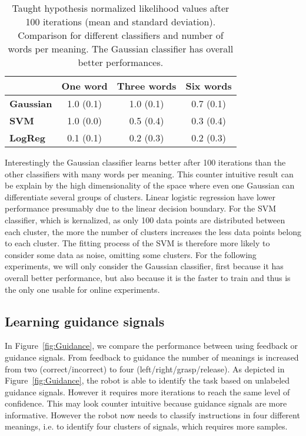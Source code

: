 \begin{table}[!htbp]
\centering
\begin{tabular}{|l|c|c|c|}
\hline
&\textbf{One word}&\textbf{Three words}&\textbf{Six words}\\\hline
\textbf{Gaussian}&1.0 (0.1)&1.0 (0.1)&0.7 (0.1)\\\hline
\textbf{SVM}&1.0 (0.0)&0.5 (0.4)&0.3 (0.4)\\\hline
\textbf{LogReg}&0.1 (0.1)&0.2 (0.3)&0.2 (0.3)\\\hline
\end{tabular}
\caption{Taught hypothesis normalized likelihood values after 100 iterations (mean and standard deviation). Comparison for different classifiers and number of words per meaning. The Gaussian classifier has overall better performances.}
\label{tab:1}
\end{table}

Interestingly the Gaussian classifier learns better after 100 iterations than the other classifiers with many words per meaning. This counter intuitive result can be explain by the high dimensionality of the space where even one Gaussian can differentiate several groups of clusters. Linear logistic regression have lower performance presumably due to the linear decision boundary. For the SVM classifier, which is kernalized, as only 100 data points are distributed between each cluster, the more the number of clusters increases the less data points belong to each cluster. The fitting process of the SVM is therefore more likely to consider some data as noise, omitting some clusters. For the following experiments, we will only consider the Gaussian classifier, first because it has overall better performance, but also because it is the faster to train and thus is the only one usable for online experiments. 


\subsection{Learning guidance signals}

In Figure~\ref{fig:Guidance}, we compare the performance between using feedback or guidance signals. From feedback to guidance the number of meanings is increased from two (correct/incorrect) to four (left/right/grasp/release). As depicted in Figure~\ref{fig:Guidance}, the robot is able to identify the task based on unlabeled guidance signals. However it requires more iterations to reach the same level of confidence. This may look counter intuitive because guidance signals are more informative. However the robot now needs to classify instructions in four different meanings, i.e. to identify four clusters of signals, which requires more samples. 

